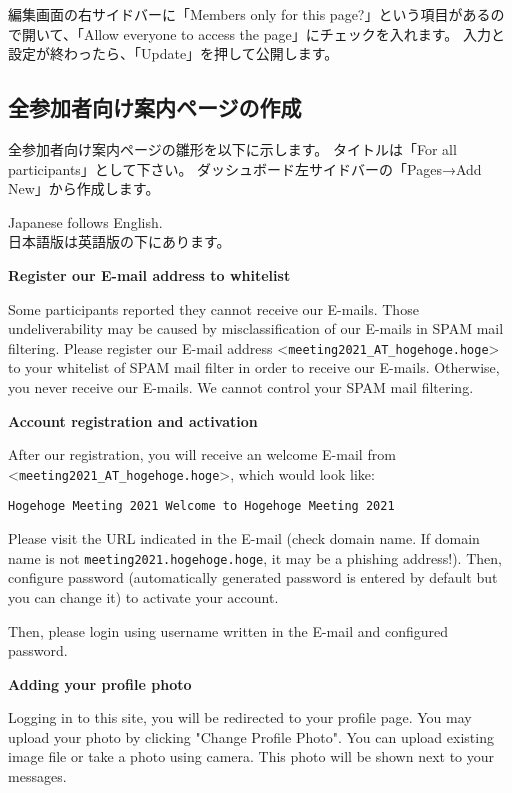 \documentclass[titlepage,10pt,a4paper,uplatex]{jsbook}
\newenvironment{content}{\begin{shaded}\vspace{-1em}\raggedright\ttfamily\footnotesize\setlength{\baselineskip}{1.4em}}{\end{shaded}\vspace{-1em}}
\renewcommand{\textbf}[1]{{\bfseries\sffamily#1}}
\begin{document}
編集画面の右サイドバーに「Members only for this page?」という項目があるので開いて、「Allow everyone to access the page」にチェックを入れます。
入力と設定が終わったら、「Update」を押して公開します。

\subsection{全参加者向け案内ページの作成}

全参加者向け案内ページの雛形を以下に示します。
タイトルは「For all participants」として下さい。
ダッシュボード左サイドバーの「Pages→Add New」から作成します。

\begin{content}
Japanese follows English.\\
日本語版は英語版の下にあります。

\textbf{\Large Register our E-mail address to whitelist}

Some participants reported they cannot receive our E-mails. Those undeliverability may be caused by misclassification of our E-mails in SPAM mail filtering. Please register our E-mail address {\textless}\texttt{meeting2021\_AT\_hogehoge.hoge}{\textgreater} to your whitelist of SPAM mail filter in order to receive our E-mails. Otherwise, you never receive our E-mails. We cannot control your SPAM mail filtering.

\textbf{\Large Account registration and activation}

After our registration, you will receive an welcome E-mail from {\textless}\texttt{meeting2021\_AT\_hogehoge.hoge}{\textgreater}, which would look like:

\texttt{{\lbrack}Hogehoge Meeting 2021{\rbrack} Welcome to Hogehoge Meeting 2021}

Please visit the URL indicated in the E-mail (check domain name. If domain name is not \texttt{meeting2021.hogehoge.hoge}, it may be a phishing address!). Then, configure password (automatically generated password is entered by default but you can change it) to activate your account.

Then, please login using username written in the E-mail and configured password.

\textbf{\Large Adding your profile photo}

Logging in to this site, you will be redirected to your profile page. You may upload your photo by clicking "Change Profile Photo". You can upload existing image file or take a photo using camera. This photo will be shown next to your messages.


\end{content}
\end{document}
